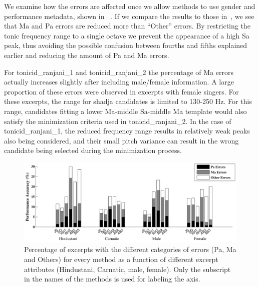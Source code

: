{We examine how the errors are affected once we allow methods to use gender and performance metadata, shown in ~. If we compare the results to those in~, we see
that Ma and Pa errors are reduced more than ``Other'' errors. By restricting the tonic frequency range to a single octave we prevent the
appearance of a high Sa peak, thus avoiding the possible confusion between fourths and fifths explained earlier and reducing the amount of Pa and Ma errors.

For \acrshort{tonicid_ranjani_1} and \acrshort{tonicid_ranjani_2} the percentage of Ma errors actually increases slightly after including male/female information. A large proportion of these errors were observed in excerpts with female singers. For these excerpts, the range for \gls{shadja} candidates is limited to 130-250 Hz. For this range, candidates fitting a lower Ma-middle Sa-middle Ma template would also satisfy the minimization criteria used in \acrshort{tonicid_ranjani_2}. In the case of \acrshort{tonicid_ranjani_1}, the reduced frequency range results in relatively weak peaks also being considered, and their small pitch variance can result in the wrong candidate being selected during the minimization process.

\begin{figure}
	\begin{center}
		\includegraphics[width=\figSizeHundred]{ch05_preprocessing/figures/Category_Errors.pdf}
	\end{center}
	\caption[Percentage of excerpts with Pa, Ma and `Other' type errors in tonic pitch identification by different approaches for different categories such as Hindustani music, Carnatic music, male and female recordings.]{Percentage of excerpts with the different categories of errors (Pa, Ma and Others) for every method as a function of different excerpt attributes (Hindustani, Carnatic, male, female). Only the subscript in the names of the methods is used for labeling the axis.}
	\label{fig:tonic_identification_categorywise_errors}
\end{figure}

}
